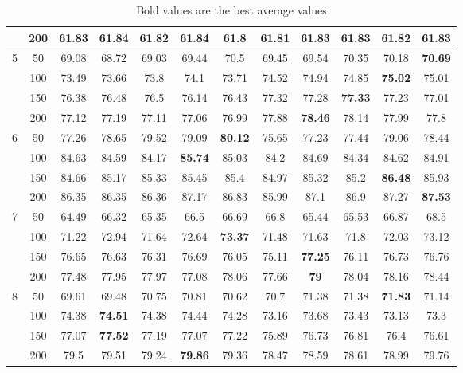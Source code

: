 \begin{table}[htbp]
{\begin{tabular}{|c|c|c|c|c|c|c|c|c|c|c|c|}
     & 200 & 61.83 & \textbf{61.84} & 61.82 & \textbf{61.84} & 61.8 & 61.81 & 61.83 & 61.83 & 61.82 & 61.83 \\ \hline
    5 & 50 & 69.08 & 68.72 & 69.03 & 69.44 & 70.5 & 69.45 & 69.54 & 70.35 & 70.18 & \textbf{70.69} \\ 
     & 100 & 73.49 & 73.66 & 73.8 & 74.1 & 73.71 & 74.52 & 74.94 & 74.85 & \textbf{75.02} & 75.01 \\ 
     & 150 & 76.38 & 76.48 & 76.5 & 76.14 & 76.43 & 77.32 & 77.28 & \textbf{77.33} & 77.23 & 77.01 \\ 
     & 200 & 77.12 & 77.19 & 77.11 & 77.06 & 76.99 & 77.88 & \textbf{78.46} & 78.14 & 77.99 & 77.8 \\ \hline
    6 & 50 & 77.26 & 78.65 & 79.52 & 79.09 & \textbf{80.12} & 75.65 & 77.23 & 77.44 & 79.06 & 78.44 \\ 
     & 100 & 84.63 & 84.59 & 84.17 & \textbf{85.74} & 85.03 & 84.2 & 84.69 & 84.34 & 84.62 & 84.91 \\ 
     & 150 & 84.66 & 85.17 & 85.33 & 85.45 & 85.4 & 84.97 & 85.32 & 85.2 & \textbf{86.48} & 85.93 \\ 
     & 200 & 86.35 & 86.35 & 86.36 & 87.17 & 86.83 & 85.99 & 87.1 & 86.9 & 87.27 & \textbf{87.53} \\ \hline
    7 & 50 & 64.49 & 66.32 & 65.35 & 66.5 & 66.69 & 66.8 & 65.44 & 65.53 & 66.87 & 68.5 \\ 
     & 100 & 71.22 & 72.94 & 71.64 & 72.64 & \textbf{73.37} & 71.48 & 71.63 & 71.8 & 72.03 & 73.12 \\ 
     & 150 & 76.65 & 76.63 & 76.31 & 76.69 & 76.05 & 75.11 & \textbf{77.25} & 76.11 & 76.73 & 76.76 \\ 
     & 200 & 77.48 & 77.95 & 77.97 & 77.08 & 78.06 & 77.66 & \textbf{79} & 78.04 & 78.16 & 78.44 \\ \hline
    8 & 50 & 69.61 & 69.48 & 70.75 & 70.81 & 70.62 & 70.7 & 71.38 & 71.38 & \textbf{71.83} & 71.14 \\ 
     & 100 & 74.38 & \textbf{74.51} & 74.38 & 74.44 & 74.28 & 73.16 & 73.68 & 73.43 & 73.13 & 73.3 \\ 
     & 150 & 77.07 & \textbf{77.52} & 77.19 & 77.07 & 77.22 & 75.89 & 76.73 & 76.81 & 76.4 & 76.61 \\ 
     & 200 & 79.5 & 79.51 & 79.24 & \textbf{79.86} & 79.36 & 78.47 & 78.59 & 78.61 & 78.99 & 79.76 \\ \hline
    \end{tabular}}
    \caption*{Bold values are the best average values}
    \label{exp:literature_cage_ratio}
\end{table}
    